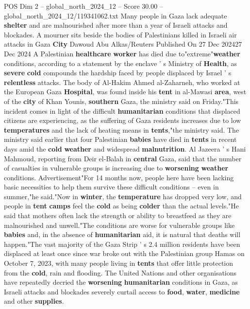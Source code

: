 \begin{textsample}{POS Dim 2 – global\_north\_2024\_12 – Score 30.00 – global\_north\_2024\_12/119341062.txt}  \label{ex:f2_pos_187}
Many people in Gaza lack adequate \textbf{shelter} and are malnourished after more than a year of Israeli attacks and blockades.
A mourner sits beside the bodies of Palestinians killed in Israeli air attacks in Gaza \textbf{City} Dawoud Abu Alkas/Reuters Published On 27 Dec 202427 Dec 2024 A Palestinian \textbf{healthcare} \textbf{worker} has died due to"extreme"\textbf{weather} conditions, according to a statement by the enclave ' s Ministry of \textbf{Health}, as \textbf{severe} \textbf{cold} compounds the hardship faced by people displaced by Israel ' s \textbf{relentless} attacks.
The body of Al-Hakim Ahmed al-Zaharneh, who worked at the European Gaza \textbf{Hospital}, was found inside his \textbf{tent} in al-Mawasi \textbf{area}, west of the \textbf{city} of Khan Younis, \textbf{southern} Gaza, the ministry said on Friday."This incident comes in light of the difficult \textbf{humanitarian} conditions that displaced citizens are experiencing, as the suffering of Gaza residents increases due to low \textbf{temperatures} and the lack of heating means in \textbf{tents},"the ministry said.
The ministry said earlier that four Palestinian \textbf{babies} have died in \textbf{tents} in recent days amid the \textbf{cold} \textbf{weather} and widespread \textbf{malnutrition}.
Al Jazeera ' s Hani Mahmoud, reporting from Deir el-Balah in \textbf{central} Gaza, said that the number of casualties in vulnerable groups is increasing due to \textbf{worsening} \textbf{weather} conditions.
Advertisement"For 14 months now, people here have been lacking basic necessities to help them survive these difficult conditions -- even in summer,"he said."Now in \textbf{winter}, the \textbf{temperature} has dropped very low, and people in \textbf{tent} \textbf{camps} feel the \textbf{cold} as being \textbf{colder} than the actual levels."He said that mothers often lack the strength or ability to breastfeed as they are malnourished and unwell."The conditions are worse for vulnerable groups like \textbf{babies} and, in the absence of \textbf{humanitarian} aid, it is natural that deaths will happen."The vast majority of the Gaza Strip ' s 2.4 million residents have been displaced at least once since war broke out with the Palestinian group Hamas on October 7, 2023, with many people living in \textbf{tents} that offer little protection from the \textbf{cold}, rain and flooding.
The United Nations and other organisations have repeatedly decried the \textbf{worsening} \textbf{humanitarian} conditions in Gaza, as Israeli attacks and blockades severely curtail access to \textbf{food}, \textbf{water}, \textbf{medicine} and other \textbf{supplies}.

\end{textsample}
